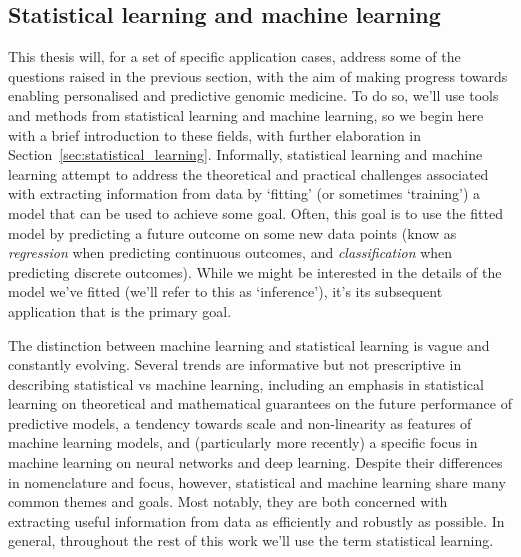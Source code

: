\documentclass[thesis.tex]{subfiles}
\begin{document}
\subsection{Statistical learning and machine learning} 
This thesis will, for a set of specific application cases, address some of the questions raised in the previous section, with the aim of making progress towards enabling personalised and predictive genomic medicine. To do so, we'll use tools and methods from statistical learning and machine learning, so we begin here with a brief introduction to these fields, with further elaboration in Section~\ref{sec:statistical_learning}. Informally, statistical learning and machine learning attempt to address the
theoretical and practical challenges associated with extracting information from data by `fitting' (or sometimes `training') a model that can be used to achieve some goal.  Often, this goal is to use the fitted model by predicting a future outcome on some new data points (know as \emph{regression} when predicting continuous outcomes, and \emph{classification} when predicting discrete outcomes). While we might be interested in the details of the model we've fitted (we'll refer to this as `inference'), it's its subsequent application that is the primary goal.

The distinction between machine learning and statistical learning is vague and constantly evolving. 
Several trends are informative but not prescriptive in describing statistical vs machine learning, including an emphasis in statistical learning on theoretical and mathematical guarantees on the future performance of predictive models, a tendency towards scale and non-linearity as features of machine learning models, and (particularly more recently) a specific focus in machine learning on neural networks and deep learning. Despite their differences in nomenclature and focus, however, statistical and machine learning share many common themes and goals. Most notably, they are both concerned with extracting useful information from data as efficiently and robustly as possible. In general, throughout the rest of this work we'll use the term statistical learning.
\end{document}
